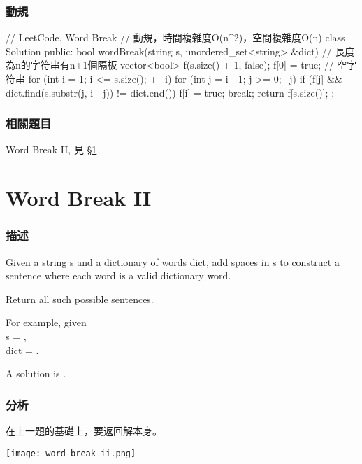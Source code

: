 \subsubsection{動規}
\begin{Code}
// LeetCode, Word Break
// 動規，時間複雜度O(n^2)，空間複雜度O(n)
class Solution {
public:
    bool wordBreak(string s, unordered_set<string> &dict) {
        // 長度為n的字符串有n+1個隔板
        vector<bool> f(s.size() + 1, false);
        f[0] = true; // 空字符串
        for (int i = 1; i <= s.size(); ++i) {
            for (int j = i - 1; j >= 0; --j) {
                if (f[j] && dict.find(s.substr(j, i - j)) != dict.end()) {
                    f[i] = true;
                    break;
                }
            }
        }
        return f[s.size()];
    }
};
\end{Code}


\subsubsection{相關題目}
\begindot
\item Word Break II, 見 \S \ref{sec:word-break-ii}
\myenddot


\section{Word Break II} %
\label{sec:word-break-ii}


\subsubsection{描述}
Given a string s and a dictionary of words dict, add spaces in s to construct a sentence where each word is a valid dictionary word.

Return all such possible sentences.

For example, given  \\
s = , \\
dict = .

A solution is .


\subsubsection{分析}
在上一題的基礎上，要返回解本身。

\begin{center}
\texttt{[image: word-break-ii.png]}\\
\label{fig:word-break-ii}
\end{center}


